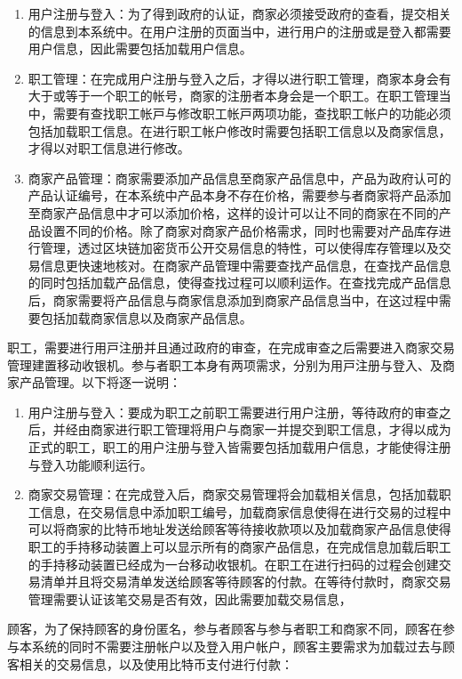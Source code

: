 	\begin{enumerate}
	\item 用户注册与登入：为了得到政府的认证，商家必须接受政府的查看，提交相关的信息到本系统中。在用户注册的页面当中，进行用户的注册或是登入都需要用户信息，因此需要包括加载用户信息。
	\item 职工管理：在完成用户注册与登入之后，才得以进行职工管理，商家本身会有大于或等于一个职工的帐号，商家的注册者本身会是一个职工。在职工管理当中，需要有查找职⼯帐⼾与修改职⼯帐⼾两项功能，查找职工帐户的功能必须包括加载职工信息。在进行职工帐户修改时需要包括职工信息以及商家信息，才得以对职工信息进行修改。
	\item 商家产品管理：商家需要添加产品信息至商家产品信息中，产品为政府认可的产品认证编号，在本系统中产品本身不存在价格，需要参与者商家将产品添加至商家产品信息中才可以添加价格，这样的设计可以让不同的商家在不同的产品设置不同的价格。除了商家对商家产品价格需求，同时也需要对产品库存进行管理，透过区块链加密货币公开交易信息的特性，可以使得库存管理以及交易信息更快速地核对。在商家产品管理中需要查找产品信息，在查找产品信息的同时包括加载产品信息，使得查找过程可以顺利运作。在查找完成产品信息后，商家需要将产品信息与商家信息添加到商家产品信息当中，在这过程中需要包括加载商家信息以及商家产品信息。

	\end{enumerate}

职⼯，需要进⾏⽤⼾注册并且通过政府的审查，在完成审查之后需要进⼊商家交易管理建置移动收银机。参与者职⼯本⾝有两项需求，分别为⽤⼾注册与登⼊、及商家产品管理。以下将逐⼀说明：


	\begin{enumerate}
	\item 用户注册与登入：要成为职工之前职工需要进行用户注册，等待政府的审查之后，并经由商家进行职工管理将用户与商家一并提交到职工信息，才得以成为正式的职工，职工的用户注册与登入皆需要包括加载用户信息，才能使得注册与登入功能顺利运行。
	\item 商家交易管理：在完成登入后，商家交易管理将会加载相关信息，包括加载职工信息，在交易信息中添加职工编号，加载商家信息使得在进行交易的过程中可以将商家的比特币地址发送给顾客等待接收款项以及加载商家产品信息使得职工的手持移动装置上可以显示所有的商家产品信息，在完成信息加载后职工的手持移动装置已经成为一台移动收银机。在职工在进行扫码的过程会创建交易清单并且将交易清单发送给顾客等待顾客的付款。在等待付款时，商家交易管理需要认证该笔交易是否有效，因此需要加载交易信息，
	\end{enumerate}

顾客，为了保持顾客的身份匿名，参与者顾客与参与者职工和商家不同，顾客在参与本系统的同时不需要注册帐户以及登入用户帐户，顾客主要需求为加载过去与顾客相关的交易信息，以及使用比特币支付进行付款：


